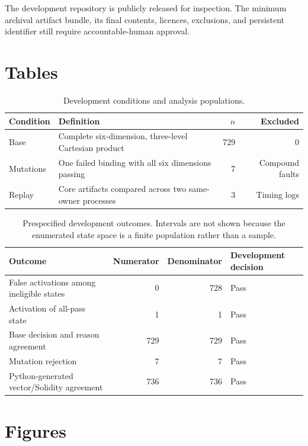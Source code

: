 \documentclass[utf8]{FrontiersinHarvard}
\begin{document}
The development repository is publicly released for inspection. The minimum archival artifact bundle, its final contents, licences, exclusions, and persistent identifier still require accountable-human approval.




\clearpage
\section*{Tables}

\begin{table}[h!]
\caption{Development conditions and analysis populations.}
\label{tab:conditions}
\begin{tabularx}{\linewidth}{@{}lYrr@{}}
\toprule
Condition & Definition & $n$ & Excluded \\
\midrule
Base & Complete six-dimension, three-level Cartesian product & 729 & 0 \\
Mutations & One failed binding with all six dimensions passing & 7 & Compound faults \\
Replay & Core artifacts compared across two same-owner processes & 3 & Timing logs \\
\bottomrule
\end{tabularx}
\end{table}

\begin{table}[h!]
\caption{Prespecified development outcomes. Intervals are not shown because the enumerated state space is a finite population rather than a sample.}
\label{tab:results}
\begin{tabularx}{\linewidth}{@{}Yrrl@{}}
\toprule
Outcome & Numerator & Denominator & Development decision \\
\midrule
False activations among ineligible states & 0 & 728 & Pass \\
Activation of all-pass state & 1 & 1 & Pass \\
Base decision and reason agreement & 729 & 729 & Pass \\
Mutation rejection & 7 & 7 & Pass \\
Python-generated vector/Solidity agreement & 736 & 736 & Pass \\
\bottomrule
\end{tabularx}
\end{table}

\clearpage
\section*{Figures}
\end{document}

